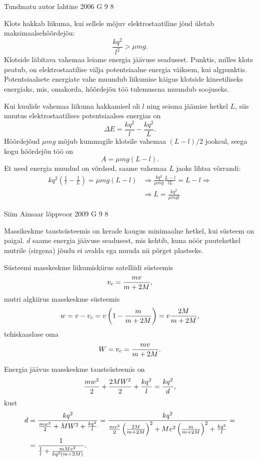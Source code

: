 \documentclass[11pt]{article}
\begin{document}
{%
{Tundmatu autor} %
{lahtine} %
{2006} %
{G 9} %
{8} %
{

\ifSolution
Klots hakkab liikuma, kui sellele mõjuv elektrostaatiline jõud ületab maksimaalsehõõrdejõu:
\[
\frac{kq^2}{l^2} > \mu mg.
\]
Klotside läbitava vahemaa leiame energia jäävuse seadusest. Punktis, milles klots peatub, on elektrostaatilise välja potentsiaalne energia väiksem, kui algpunktis. Potentsiaalsete energiate vahe muundub liikumise käigus klotside kineetiliseks energiaks, mis, omakorda, hõõrdejõu töö tulemusena muundub soojuseks.

Kui kuulide vahemaa liikuma hakkamisel oli $l$ ning seisma jäämise hetkel $L$, siis muutus elektrostaatilises potentsiaalses energias on
\[
\Delta E = \frac{kq^2}{l} - \frac{kq^2}{L}.
\]
Hõõrdejõud $\mu mg$ mõjub kummagile klotsile vahemaa $(L-l)/2$ jooksul, seega kogu
hõõrdejõu töö on
\[
A = \mu mg (L - l).
\]
Et need energia muudud on võrdsed, saame vahemaa $L$ jaoks lihtsa võrrandi:
\[
\begin{aligned}
k q^{2}\left(\frac{1}{l}-\frac{1}{L}\right)=\mu m g(L-l) &\Rightarrow \frac{k q^{2}}{\mu m g} \frac{L-l}{l L}=L-l \Rightarrow\\
&\Rightarrow L=\frac{k q^{2}}{\mu m g l}
\end{aligned}
\]
\fi
}

{Siim Ainsaar} %
{lõppvoor} %
{2009} %
{G 9} %
{8} %
{

\ifSolution
Massikeskme taustsüsteemis on kerade kaugus minimaalne hetkel, kui süsteem on
paigal. $d$ saame energia jäävuse seadusest, mis kehtib, kuna nöör puutehetkel
mutrile (sirgena) jõudu ei avalda ega muuda nii põrget plastseks.

Süsteemi masskeskme liikumiskiirus satelliidi süsteemis
\[ v_c = \frac{m v}{m+2M} \text, \]
mutri algkiirus masskeskme süsteemis
\[ w = v - v_c = v \left(1 - \frac{m}{m+2M}\right) = v \frac{2M}{m+2M} \text, \]
tehiskaaslase oma
\[ W = v_c = \frac{m v}{m+2M} \text. \]

Energia jäävus masskeskme taustsüsteemis on
\[
\frac{m w^2}{2} + \frac{2M W^2}{2} + \frac{k q^2}{l} = \frac{k q^2}{d} \text,
\]
kust
\begin{align*}
d &= \frac{k q^2}{\frac{m w^2}{2} + M W^2 + \frac{k q^2}{l}} =
\frac{k q^2}{\frac{m v^2}{2} \left(\frac{2M}{m+2M}\right)^2 + M v^2
	\left(\frac{m}{m+2M}\right)^2 + \frac{k q^2}{l}} = \\
&= \frac{1}{\frac{1}{l} + \frac{m M v^2}{k q^2 (m+2M)}}
\text.
\end{align*}

}}
\end{document}
